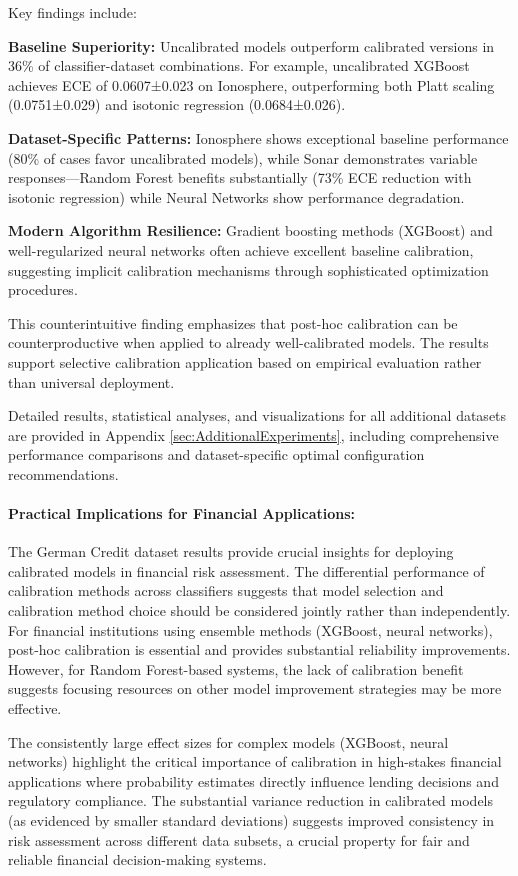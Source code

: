 \documentclass[12pt, a4paper]{article}
\begin{document}
Key findings include:

\textbf{Baseline Superiority:} Uncalibrated models outperform calibrated versions in 36\% of classifier-dataset combinations. For example, uncalibrated XGBoost achieves ECE of 0.0607±0.023 on Ionosphere, outperforming both Platt scaling (0.0751±0.029) and isotonic regression (0.0684±0.026).

\textbf{Dataset-Specific Patterns:} Ionosphere shows exceptional baseline performance (80\% of cases favor uncalibrated models), while Sonar demonstrates variable responses—Random Forest benefits substantially (73\% ECE reduction with isotonic regression) while Neural Networks show performance degradation.

\textbf{Modern Algorithm Resilience:} Gradient boosting methods (XGBoost) and well-regularized neural networks often achieve excellent baseline calibration, suggesting implicit calibration mechanisms through sophisticated optimization procedures.

This counterintuitive finding emphasizes that post-hoc calibration can be counterproductive when applied to already well-calibrated models. The results support selective calibration application based on empirical evaluation rather than universal deployment.

Detailed results, statistical analyses, and visualizations for all additional datasets are provided in Appendix \ref{sec:AdditionalExperiments}, including comprehensive performance comparisons and dataset-specific optimal configuration recommendations.

\paragraph{Practical Implications for Financial Applications:} The German Credit dataset results provide crucial insights for deploying calibrated models in financial risk assessment. The differential performance of calibration methods across classifiers suggests that model selection and calibration method choice should be considered jointly rather than independently. For financial institutions using ensemble methods (XGBoost, neural networks), post-hoc calibration is essential and provides substantial reliability improvements. However, for Random Forest-based systems, the lack of calibration benefit suggests focusing resources on other model improvement strategies may be more effective.

The consistently large effect sizes for complex models (XGBoost, neural networks) highlight the critical importance of calibration in high-stakes financial applications where probability estimates directly influence lending decisions and regulatory compliance. The substantial variance reduction in calibrated models (as evidenced by smaller standard deviations) suggests improved consistency in risk assessment across different data subsets, a crucial property for fair and reliable financial decision-making systems.
\end{document}
